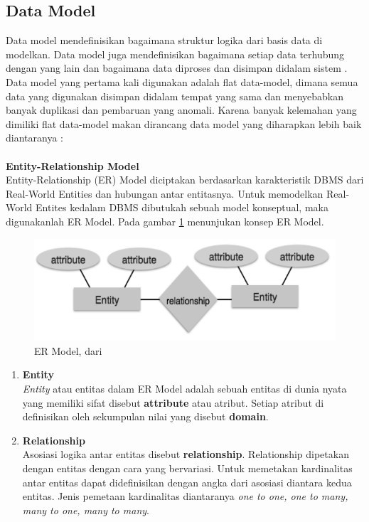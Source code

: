 \subsection{Data Model}
Data model mendefinisikan bagaimana struktur logika dari basis data di modelkan. Data model juga mendefinisikan bagaimana setiap data terhubung dengan yang lain dan bagaimana data diproses dan disimpan didalam sistem \cite{DBMS:2015}. Data model yang pertama kali digunakan adalah flat data-model, dimana semua data yang digunakan disimpan didalam tempat yang sama dan menyebabkan banyak duplikasi dan pembaruan yang anomali. Karena banyak kelemahan yang dimiliki flat data-model makan dirancang data model yang diharapkan lebih baik diantaranya :\\\\
\textbf{Entity-Relationship Model}\\
Entity-Relationship (ER) Model diciptakan berdasarkan karakteristik DBMS dari Real-World Entities dan hubungan antar entitasnya. Untuk memodelkan Real-World Entites kedalam DBMS dibutukah sebuah model konseptual, maka digunakanlah ER Model. Pada gambar \ref{fig:erd} menunjukan konsep ER Model.
	\begin{figure}
	\centering
	\includegraphics[width=0.6\linewidth]{Gambar/mine/erd}
	\caption[ER Model, dari \cite{DBMS:2015}]{ER Model, dari \cite{DBMS:2015}} 
	\label{fig:erd}
	\end{figure}
\begin{enumerate}
	\item \textbf{Entity}\\
	\textit{Entity} atau entitas dalam ER Model adalah sebuah entitas di dunia nyata yang memiliki sifat disebut \textbf{attribute} atau atribut. Setiap atribut di definisikan oleh sekumpulan nilai yang disebut \textbf{domain}.
	\item \textbf{Relationship}\\
	Asosiasi logika antar entitas disebut \textbf{relationship}. Relationship dipetakan dengan entitas dengan cara yang bervariasi. Untuk memetakan kardinalitas antar entitas dapat didefinisikan dengan angka dari asosiasi diantara kedua entitas. Jenis pemetaan kardinalitas diantaranya \textit{one to one, one to many, many to one, many to many}.
\end{enumerate}
